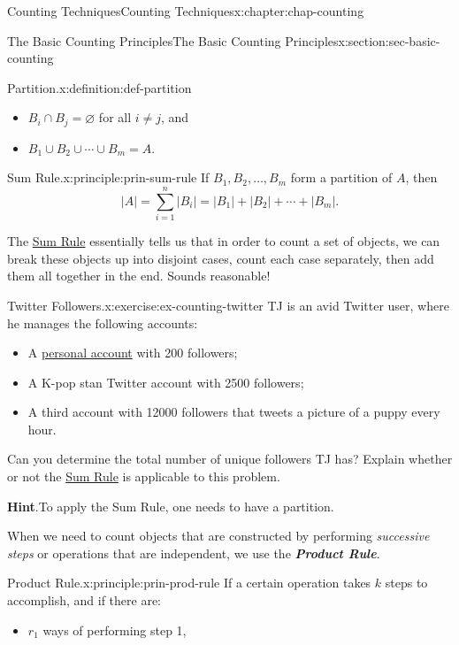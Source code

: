 \documentclass[oneside,10pt,]{book}
\newcommand{\blocktitlefont}{\relax}
\newcommand{\alert}[1]{\textbf{\textit{#1}}}
\numberwithin{equation}{section}
\begin{document}
\begin{chapterptx}{Counting Techniques}{}{Counting Techniques}{}{}{x:chapter:chap-counting}
\begin{sectionptx}{The Basic Counting Principles}{}{The Basic Counting Principles}{}{}{x:section:sec-basic-counting}
\begin{definition}{Partition.}{x:definition:def-partition}
\begin{itemize}[label=\textbullet]
\item{}\(B_i \cap B_j = \varnothing\) for all \(i \ne j\), and%
\item{}\(B_1 \cup B_2 \cup \cdots \cup B_m = A\).%
\end{itemize}
%
\end{definition}
\begin{principle}{Sum Rule.}{}{x:principle:prin-sum-rule}%
If \(B_1,B_2,\ldots,B_m\) form a partition of \(A\), then%
\begin{equation*}
|A| = \sum_{i=1}^n |B_i| = |B_1| + |B_2| + \cdots + |B_m|\text{.}
\end{equation*}
%
\end{principle}
The \hyperref[x:principle:prin-sum-rule]{Sum Rule} essentially tells us that in order to count a set of objects, we can break these objects up into disjoint cases, count each case separately, then add them all together in the end. Sounds reasonable!%
\begin{inlineexercise}{Twitter Followers.}{x:exercise:ex-counting-twitter}%
TJ is an avid Twitter user, where he manages the following accounts:%
\begin{itemize}[label=\textbullet]
\item{}A \href{https://twitter.com/tjyusun}{personal account} with 200 followers;%
\item{}A K-pop stan Twitter account with 2500 followers;%
\item{}A third account with 12000 followers that tweets a picture of a puppy every hour.%
\end{itemize}
Can you determine the total number of unique followers TJ has? Explain whether or not the \hyperref[x:principle:prin-sum-rule]{Sum Rule} is applicable to this problem.%
\par\smallskip%
\noindent\textbf{\blocktitlefont Hint}.\hypertarget{g:hint:id237402}{}\quad{}To apply the Sum Rule, one needs to have a partition.%
\end{inlineexercise}
When we need to count objects that are constructed by performing \emph{successive steps} or operations that are independent, we use the \alert{Product Rule}.%
\begin{principle}{Product Rule.}{}{x:principle:prin-prod-rule}%
If a certain operation takes \(k\) steps to accomplish, and if there are:%
\begin{itemize}[label=\textbullet]
\item{}\(r_1\) ways of performing step 1,%

\end{itemize}
\end{principle}
\end{sectionptx}
\end{chapterptx}
\end{document}
